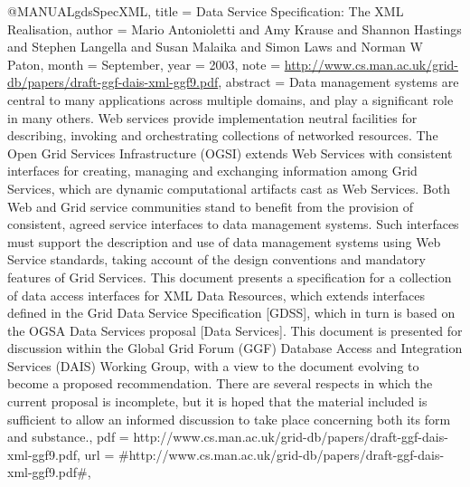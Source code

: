 @MANUAL{gdsSpecXML,
  title = {{Data Service Specification: The XML Realisation}},
  author = {Mario Antonioletti and Amy Krause and Shannon Hastings and Stephen
	Langella and Susan Malaika and Simon Laws and Norman W Paton},
  month = {September},
  year = {2003},
  note = {\url{http://www.cs.man.ac.uk/grid-db/papers/draft-ggf-dais-xml-ggf9.pdf}},
  abstract = {Data management systems are central to many applications across multiple
domains,
	and play a significant role in many others. Web services
provide
	implementation neutral facilities for describing, invoking and
orchestrating
	collections of networked resources. The Open Grid Services
Infrastructure
	(OGSI) extends Web Services with consistent interfaces for
creating,
	managing and exchanging information among Grid Services, which
are
	dynamic computational artifacts cast as Web Services. Both Web
and
	Grid service communities stand to benefit from the provision of
consistent,
	agreed service interfaces to data management systems. Such
interfaces
	must support the description and use of data management systems
using
	Web Service standards, taking account of the design conventions
and
	mandatory features of Grid Services. This document presents a
specification
	for a collection of data access interfaces for XML
Data Resources,
	which extends interfaces defined in the Grid Data
Service Specification
	[GDSS], which in turn is based on the OGSA
Data Services proposal
	[Data Services]. This document is presented
for discussion within
	the Global Grid Forum (GGF) Database Access
and Integration Services
	(DAIS) Working Group, with a view to the
document evolving to become
	a proposed recommendation. There are
several respects in which the
	current proposal is incomplete, but it is
hoped that the material
	included is sufficient to allow an informed
discussion to take place
	concerning both its form and substance.},
  pdf = {http://www.cs.man.ac.uk/grid-db/papers/draft-ggf-dais-xml-ggf9.pdf},
  url = {#http://www.cs.man.ac.uk/grid-db/papers/draft-ggf-dais-xml-ggf9.pdf#},
}

